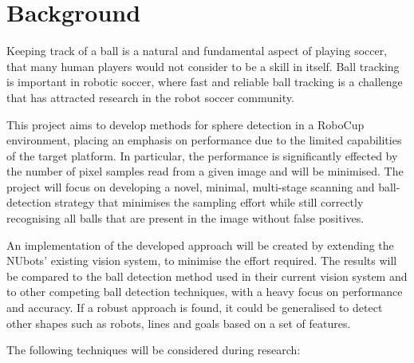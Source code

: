 \documentclass[11pt]{scrartcl} %
\begin{document}
	\section{Background} {

		Keeping track of a ball is a natural and fundamental aspect of playing soccer, that many human players would not consider to be a skill in itself. Ball tracking is important in robotic soccer, where fast and reliable ball tracking is a challenge that has attracted research in the robot soccer community.

		This project aims to develop methods for sphere detection in a RoboCup environment, placing an emphasis on performance due to the limited capabilities of the target platform. In particular, the performance is significantly effected by the number of pixel samples read from a given image and will be minimised. The project will focus on developing a novel, minimal, multi-stage scanning and ball-detection strategy that minimises the sampling effort while still correctly recognising all balls that are present in the image without false positives.

		An implementation of the developed approach will be created by extending the NUbots’ existing vision system, to minimise the effort required. The results will be compared to the ball detection method used in their current vision system and to other competing ball detection techniques, with a heavy focus on performance and accuracy. If a robust approach is found, it could be generalised to detect other shapes such as robots, lines and goals based on a set of features.

		The following techniques will be considered during research:

}
\end{document}

